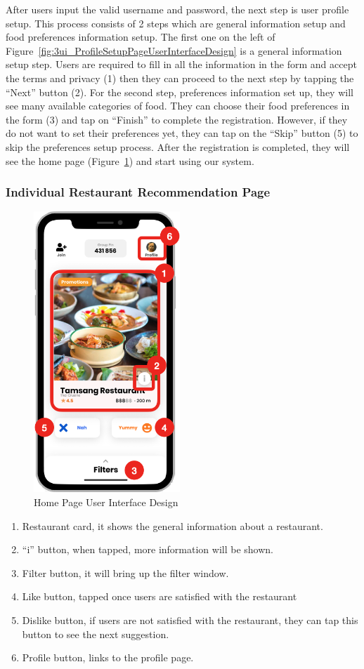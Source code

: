 \documentclass[12pt,oneside,openright,a4paper]{cpe-english-project}
\begin{document}
After users input the valid username and password, the next step is user profile setup. This process consists of 2 steps which are general information setup and food preferences information setup. The first one on the left of Figure~\ref{fig:3ui_ProfileSetupPageUserInterfaceDesign} is a general information setup step. Users are required to fill in all the information in the form and accept the terms and privacy (1) then they can proceed to the next step by tapping the “Next” button (2). For the second step, preferences information set up, they will see many available categories of food. They can choose their food preferences in the form (3) and tap on “Finish” to complete the registration. However, if they do not want to set their preferences yet, they can tap on the “Skip” button (5) to skip the preferences setup process. After the registration is completed, they will see the home page (Figure~\ref{fig:3ui_HomePageUserInterfaceDesign}) and start using our system.

\newpage
\subsubsection{Individual Restaurant Recommendation Page}
\begin{figure}[H]\centering
\includegraphics[height=300pt]{./images/3ui_HomePageUserInterfaceDesign.png}
\caption{Home Page User Interface Design}\label{fig:3ui_HomePageUserInterfaceDesign}
\end{figure}

\begin{enumerate}
\item Restaurant card, it shows the general information about a restaurant.
\item “i” button, when tapped, more information will be shown.
\item Filter button, it will bring up the filter window.
\item Like button, tapped once users are satisfied with the restaurant
\item Dislike button, if users are not satisfied with the restaurant, they can tap this button to see the next suggestion.
\item Profile button, links to the profile page.
\end{enumerate}
\end{document}
